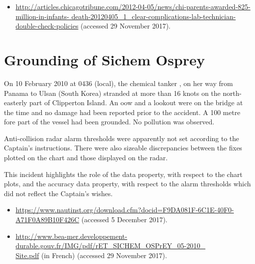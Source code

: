 \begin{samepage}
\begin{itemize}
  \item \raggedright{\href{http://articles.chicagotribune.com/2012-04-05/news/chi-parents-awarded-825-million-in-infants-death-20120405_1_clear-complications-lab-technician-double-check-policies}{http://articles.chicagotribune.com/2012-04-05/news/chi-parents-awarded-825-million-in-infants- death-20120405\_1\_clear-complications-lab-technician-double-check-policies} (accessed 29 November 2017).}
\end{itemize}
\end{samepage}


\section{Grounding of Sichem Osprey} \label{bkm:incacc:sichemosprey}
On 10 February 2010 at 0436 (local), the chemical tanker , on her way from Panama to Ulsan (South Korea) stranded at more than 16 knots on the north-easterly part of Clipperton Island. An \gls{oow} and a lookout were on the bridge at the time and no damage had been reported prior to the accident. A 100 metre fore part of the vessel had been grounded. No pollution was observed.

Anti-collision radar alarm thresholds were apparently not set according to the Captain's instructions. There were also sizeable discrepancies between the fixes plotted on the chart and those displayed on the radar.

This incident highlights the role of the  \gls{data property}, with respect to the chart plots, and the \gls{accuracy} \gls{data property}, with respect to the alarm thresholds which did not reflect the Captain's wishes.

\begin{samepage}
\begin{itemize}
	\item \raggedright{\href{https://www.nautinst.org/download.cfm?docid=F9DA081F-6C1E-40F0-A71F0A89B10F426C}{https://www.nautinst.org/download.cfm?docid=F9DA081F-6C1E-40F0-A71F0A89B10F426C} (accessed 5 December 2017).}
  \item \raggedright{\href{http://www.bea-mer.developpement-durable.gouv.fr/IMG/pdf/rET_SICHEM_OSPrEY_05-2010_Site.pdf}{http://www.bea-mer.developpement-durable.gouv.fr/IMG/pdf/rET\_SICHEM\_OSPrEY\_05-2010\_\\Site.pdf} (in French) (accessed 29 November 2017).}
\end{itemize}
\end{samepage}


